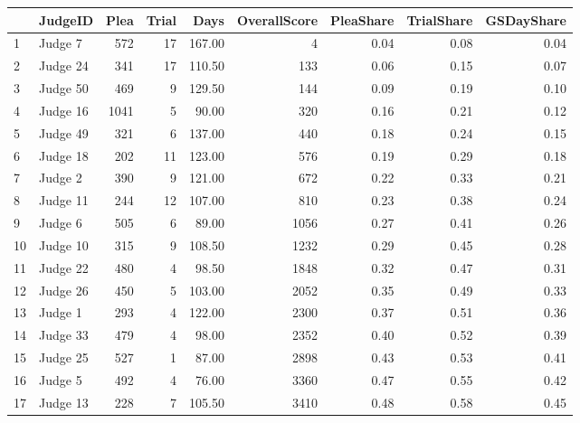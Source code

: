 \begin{tabular}{llrrrrrrr}
\toprule
{} &   JudgeID &  Plea &  Trial &   Days &  OverallScore &  PleaShare &  TrialShare &  GSDayShare \\
\midrule
1  &   Judge 7 &   572 &     17 & 167.00 &             4 &       0.04 &        0.08 &        0.04 \\
2  &  Judge 24 &   341 &     17 & 110.50 &           133 &       0.06 &        0.15 &        0.07 \\
3  &  Judge 50 &   469 &      9 & 129.50 &           144 &       0.09 &        0.19 &        0.10 \\
4  &  Judge 16 &  1041 &      5 &  90.00 &           320 &       0.16 &        0.21 &        0.12 \\
5  &  Judge 49 &   321 &      6 & 137.00 &           440 &       0.18 &        0.24 &        0.15 \\
6  &  Judge 18 &   202 &     11 & 123.00 &           576 &       0.19 &        0.29 &        0.18 \\
7  &   Judge 2 &   390 &      9 & 121.00 &           672 &       0.22 &        0.33 &        0.21 \\
8  &  Judge 11 &   244 &     12 & 107.00 &           810 &       0.23 &        0.38 &        0.24 \\
9  &   Judge 6 &   505 &      6 &  89.00 &          1056 &       0.27 &        0.41 &        0.26 \\
10 &  Judge 10 &   315 &      9 & 108.50 &          1232 &       0.29 &        0.45 &        0.28 \\
11 &  Judge 22 &   480 &      4 &  98.50 &          1848 &       0.32 &        0.47 &        0.31 \\
12 &  Judge 26 &   450 &      5 & 103.00 &          2052 &       0.35 &        0.49 &        0.33 \\
13 &   Judge 1 &   293 &      4 & 122.00 &          2300 &       0.37 &        0.51 &        0.36 \\
14 &  Judge 33 &   479 &      4 &  98.00 &          2352 &       0.40 &        0.52 &        0.39 \\
15 &  Judge 25 &   527 &      1 &  87.00 &          2898 &       0.43 &        0.53 &        0.41 \\
16 &   Judge 5 &   492 &      4 &  76.00 &          3360 &       0.47 &        0.55 &        0.42 \\
17 &  Judge 13 &   228 &      7 & 105.50 &          3410 &       0.48 &        0.58 &        0.45 \\

\end{tabular}
